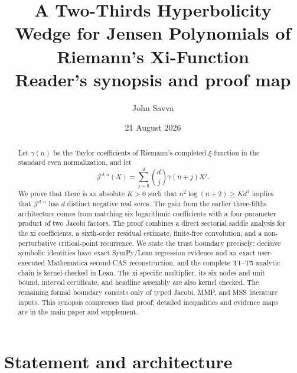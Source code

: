 \documentclass[11pt]{article}
\title{A Two-Thirds Hyperbolicity Wedge for Jensen Polynomials of
Riemann's Xi-Function\\\large Reader's synopsis and proof map}
\author{John Savva}
\date{21 August 2026}
\theoremstyle{definition}
\theoremstyle{remark}
\newcommand{\J}{\mathcal J}
\begin{document}
\maketitle

\begin{center}
\end{center}

\begin{abstract}
Let $\gamma(n)$ be the Taylor coefficients of Riemann's completed
$\xi$-function in the standard even normalization, and let
\[
  \J^{d,n}(X)=\sum_{j=0}^d \binom{d}{j}\gamma(n+j)X^j.
\]
We prove that there is an absolute $K>0$ such that
$n^2\log(n+2)\ge Kd^3$ implies that $\J^{d,n}$ has $d$ distinct negative
real zeros.  The gain from the earlier three-fifths architecture comes from
matching six logarithmic coefficients with a four-parameter product of two
Jacobi factors.  The proof combines a direct sectorial saddle analysis for
the xi coefficients, a sixth-order residual estimate, finite-free
convolution, and a non-perturbative critical-point recurrence.  We state the
trust boundary precisely: decisive symbolic identities have exact
SymPy/Lean regression evidence and an exact user-executed Mathematica
second-CAS reconstruction, and the complete T1--T5 analytic chain is
kernel-checked in Lean.  The xi-specific multiplier, its six nodes and unit
bound, interval certificate, and headline assembly are also kernel checked.
The remaining formal boundary consists only of typed Jacobi, MMP, and MSS
literature inputs.
This synopsis compresses that proof; detailed inequalities and evidence maps
are in the main paper and supplement.
\end{abstract}

\section{Statement and architecture}
\end{document}
